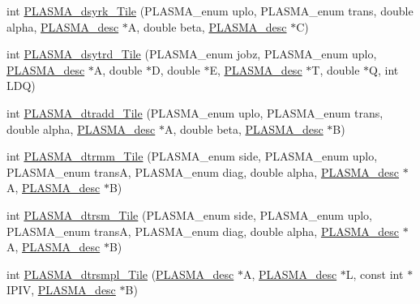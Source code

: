 \begin{DoxyCompactItemize}
\item 
int \hyperlink{group__double__Tile_ga484a28584256b741614a1a4b0cd85f6c_ga484a28584256b741614a1a4b0cd85f6c}{P\+L\+A\+S\+M\+A\+\_\+dsyrk\+\_\+\+Tile} (P\+L\+A\+S\+M\+A\+\_\+enum uplo, P\+L\+A\+S\+M\+A\+\_\+enum trans, double alpha, \hyperlink{structplasma__desc__t}{P\+L\+A\+S\+M\+A\+\_\+desc} $\ast$A, double beta, \hyperlink{structplasma__desc__t}{P\+L\+A\+S\+M\+A\+\_\+desc} $\ast$C)
\item 
int \hyperlink{group__double__Tile_gaed4c2e3efd70d4e022d8cfd71906bbe1_gaed4c2e3efd70d4e022d8cfd71906bbe1}{P\+L\+A\+S\+M\+A\+\_\+dsytrd\+\_\+\+Tile} (P\+L\+A\+S\+M\+A\+\_\+enum jobz, P\+L\+A\+S\+M\+A\+\_\+enum uplo, \hyperlink{structplasma__desc__t}{P\+L\+A\+S\+M\+A\+\_\+desc} $\ast$A, double $\ast$D, double $\ast$E, \hyperlink{structplasma__desc__t}{P\+L\+A\+S\+M\+A\+\_\+desc} $\ast$T, double $\ast$Q, int L\+D\+Q)
\item 
int \hyperlink{group__double__Tile_gad3716ac875ef900c0115eb9db046ff48_gad3716ac875ef900c0115eb9db046ff48}{P\+L\+A\+S\+M\+A\+\_\+dtradd\+\_\+\+Tile} (P\+L\+A\+S\+M\+A\+\_\+enum uplo, P\+L\+A\+S\+M\+A\+\_\+enum trans, double alpha, \hyperlink{structplasma__desc__t}{P\+L\+A\+S\+M\+A\+\_\+desc} $\ast$A, double beta, \hyperlink{structplasma__desc__t}{P\+L\+A\+S\+M\+A\+\_\+desc} $\ast$B)
\item 
int \hyperlink{group__double__Tile_ga2c1f1dda933e118025994dbcb4250af3_ga2c1f1dda933e118025994dbcb4250af3}{P\+L\+A\+S\+M\+A\+\_\+dtrmm\+\_\+\+Tile} (P\+L\+A\+S\+M\+A\+\_\+enum side, P\+L\+A\+S\+M\+A\+\_\+enum uplo, P\+L\+A\+S\+M\+A\+\_\+enum trans\+A, P\+L\+A\+S\+M\+A\+\_\+enum diag, double alpha, \hyperlink{structplasma__desc__t}{P\+L\+A\+S\+M\+A\+\_\+desc} $\ast$A, \hyperlink{structplasma__desc__t}{P\+L\+A\+S\+M\+A\+\_\+desc} $\ast$B)
\item 
int \hyperlink{group__double__Tile_gaaf9851df5808ed2346c5c5cf3329e33b_gaaf9851df5808ed2346c5c5cf3329e33b}{P\+L\+A\+S\+M\+A\+\_\+dtrsm\+\_\+\+Tile} (P\+L\+A\+S\+M\+A\+\_\+enum side, P\+L\+A\+S\+M\+A\+\_\+enum uplo, P\+L\+A\+S\+M\+A\+\_\+enum trans\+A, P\+L\+A\+S\+M\+A\+\_\+enum diag, double alpha, \hyperlink{structplasma__desc__t}{P\+L\+A\+S\+M\+A\+\_\+desc} $\ast$A, \hyperlink{structplasma__desc__t}{P\+L\+A\+S\+M\+A\+\_\+desc} $\ast$B)
\item 
int \hyperlink{group__double__Tile_gaf29c5277409d9dbf994699d012f297ef_gaf29c5277409d9dbf994699d012f297ef}{P\+L\+A\+S\+M\+A\+\_\+dtrsmpl\+\_\+\+Tile} (\hyperlink{structplasma__desc__t}{P\+L\+A\+S\+M\+A\+\_\+desc} $\ast$A, \hyperlink{structplasma__desc__t}{P\+L\+A\+S\+M\+A\+\_\+desc} $\ast$L, const int $\ast$I\+P\+I\+V, \hyperlink{structplasma__desc__t}{P\+L\+A\+S\+M\+A\+\_\+desc} $\ast$B)

\end{DoxyCompactItemize}
